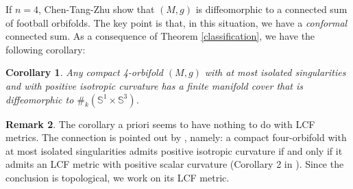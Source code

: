 \documentclass[12pt]{amsart}
\newtheorem{theorem}{Theorem}[section]
\newtheorem{corollary}[theorem]{Corollary}
\theoremstyle{definition}
\newtheorem{remark}[theorem]{Remark}
\begin{document}







If $n = 4$,  Chen-Tang-Zhu \cite{ChenZhu} show that $(M,g)$ is diffeomorphic to a connected sum of football orbifolds. The key point is that, in this situation, we have a \textit{conformal} connected sum. As a consequence of Theorem \ref{classification}, we have the following corollary:
\begin{corollary}\label{isotropy}
    Any compact 4-orbifold $(M,g)$ with at most isolated
singularities and with positive isotropic curvature has a finite
manifold cover that is diffeomorphic to $\#_k (\mathbb{S}^1 \times \mathbb{S}^3)$.
\end{corollary}
\begin{remark}
    The corollary a priori seems to have nothing to do with LCF metrics. The connection is pointed out by \cite{ChenZhu}, namely: a compact four-orbifold with at most isolated singularities admits positive isotropic curvature if and only if it admits an LCF metric with positive scalar curvature (Corollary 2 in \cite{ChenZhu}). Since the conclusion is topological, we work on its LCF metric. 
\end{remark}
\end{document}
